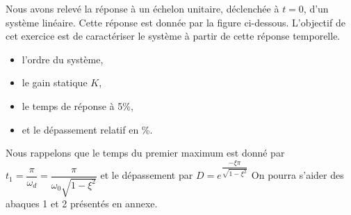 Nous avons relevé la réponse à un échelon unitaire, 
déclenchée à $t=0$, d'un système linéaire.
Cette réponse est donnée par la figure ci-dessous.
L'objectif de cet exercice est de caractériser le système 
à partir de cette réponse temporelle.
\begin{center}
    
\end{center}
\begin{itemize}
    \item l'ordre du système,
    \item le gain statique $K$,
    \item le temps de réponse à 5\%,
    \item et le dépassement relatif en \%.
\end{itemize}
Nous rappelons que le temps du premier maximum est 
donné par $t_1=\dfrac{\pi}{\omega_d}=\dfrac{\pi}{\omega_0\sqrt{1-\xi^2}}$
et le dépassement par $D=e^{\dfrac{-\xi\pi}{\sqrt{1-\xi^2}}}$
On pourra s'aider des abaques 1 et 2 présentés en annexe.
\clearpage
